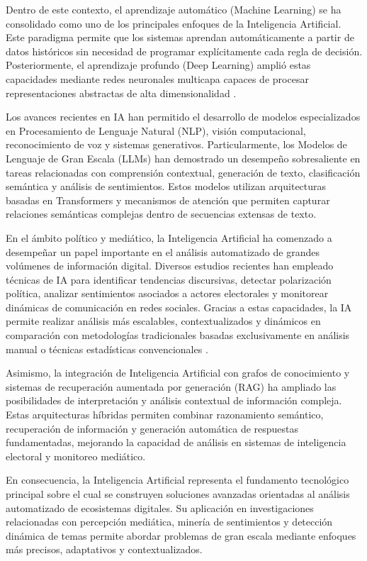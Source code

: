 Dentro de este contexto, el aprendizaje automático (Machine Learning) se ha consolidado como uno de los principales enfoques de la Inteligencia Artificial. Este paradigma permite que los sistemas aprendan automáticamente a partir de datos históricos sin necesidad de programar explícitamente cada regla de decisión. Posteriormente, el aprendizaje profundo (Deep Learning) amplió estas capacidades mediante redes neuronales multicapa capaces de procesar representaciones abstractas de alta dimensionalidad \parencite{bk_russell2004intart}.

Los avances recientes en IA han permitido el desarrollo de modelos especializados en Procesamiento de Lenguaje Natural (NLP), visión computacional, reconocimiento de voz y sistemas generativos. Particularmente, los Modelos de Lenguaje de Gran Escala (LLMs) han demostrado un desempeño sobresaliente en tareas relacionadas con comprensión contextual, generación de texto, clasificación semántica y análisis de sentimientos. Estos modelos utilizan arquitecturas basadas en Transformers y mecanismos de atención que permiten capturar relaciones semánticas complejas dentro de secuencias extensas de texto.

En el ámbito político y mediático, la Inteligencia Artificial ha comenzado a desempeñar un papel importante en el análisis automatizado de grandes volúmenes de información digital. Diversos estudios recientes han empleado técnicas de IA para identificar tendencias discursivas, detectar polarización política, analizar sentimientos asociados a actores electorales y monitorear dinámicas de comunicación en redes sociales. Gracias a estas capacidades, la IA permite realizar análisis más escalables, contextualizados y dinámicos en comparación con metodologías tradicionales basadas exclusivamente en análisis manual o técnicas estadísticas convencionales \parencite{bk_russell2004intart}.

Asimismo, la integración de Inteligencia Artificial con grafos de conocimiento y sistemas de recuperación aumentada por generación (RAG) ha ampliado las posibilidades de interpretación y análisis contextual de información compleja. Estas arquitecturas híbridas permiten combinar razonamiento semántico, recuperación de información y generación automática de respuestas fundamentadas, mejorando la capacidad de análisis en sistemas de inteligencia electoral y monitoreo mediático.

En consecuencia, la Inteligencia Artificial representa el fundamento tecnológico principal sobre el cual se construyen soluciones avanzadas orientadas al análisis automatizado de ecosistemas digitales. Su aplicación en investigaciones relacionadas con percepción mediática, minería de sentimientos y detección dinámica de temas permite abordar problemas de gran escala mediante enfoques más precisos, adaptativos y contextualizados.

